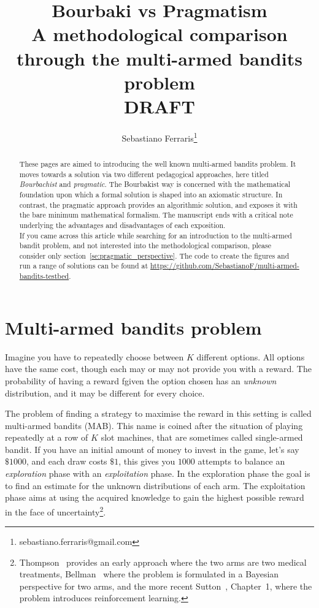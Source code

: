 \documentclass[]{scrartcl}
\title{Bourbaki vs Pragmatism \\ A methodological comparison through the multi-armed bandits problem \\
DRAFT}
\author{Sebastiano Ferraris\footnote{sebastiano.ferraris@gmail.com}}
\theoremstyle{definition}
\begin{document}
\maketitle

\begin{abstract}
These pages are aimed to introducing the well known multi-armed bandits problem. It moves towards a solution via two different pedagogical approaches, here titled \emph{Bourbachist} and \emph{pragmatic}. The Bourbakist way is concerned with the mathematical foundation upon which a formal solution is shaped into an axiomatic structure. In contrast, the pragmatic approach provides an algorithmic solution, and exposes it with the bare minimum mathematical formalism.
The manuscript ends with a critical note underlying the advantages and disadvantages of each exposition. \\

\noindent
If you came across this article while searching for an introduction to the multi-armed bandit problem, and not interested into the methodological comparison, please consider only section~\ref{se:pragmatic_perspective}. The code to create the figures and run a range of solutions can be found at \href{https://github.com/SebastianoF/multi-armed-bandits-testbed}{https://github.com/SebastianoF/multi-armed-bandits-testbed}.
\end{abstract}


\section{Multi-armed bandits problem}
\label{se:intro}
Imagine you have to repeatedly choose between $K$ different options. All options have the same cost, though each may or may not provide you with a reward. The probability of having a reward fgiven the option chosen has an \emph{unknown} distribution, and it may be different for every choice.

The problem of finding a strategy to maximise the reward in this setting is called multi-armed bandits (MAB). This name is coined after the situation of playing repeatedly at a row of $K$ slot machines, that are sometimes called single-armed bandit. If you have an initial amount of money to invest in the game, let's say $\$1000$, and each draw costs $\$1$, this gives you $1000$ attempts to balance an \emph{exploration} phase with an \emph{exploitation} phase. In the exploration phase the goal is to find an estimate for the unknown distributions of each arm. The exploitation phase aims at using the acquired knowledge to gain the highest possible reward in the face of uncertainty\footnote{
    Thompson~\cite{thompson1933likelihood} provides an early approach where the two arms are two medical treatments, Bellman~\cite{bellman1956problem} where the problem is formulated in a Bayesian perspective for two arms, and the more recent Sutton~\cite{sutton2018reinforcement}, Chapter~1, where the problem introduces reinforcement learning.
}.
\end{document}
